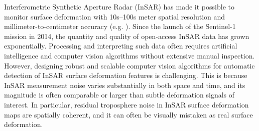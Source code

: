 Interferometric Synthetic Aperture Radar (InSAR) has made it possible to monitor surface deformation with 10s–100s meter spatial resolution and millimeter-to-centimeter accuracy (e.g. \cite{Pritchard2004InSARbasedsurvey,  Chaussard2014PredictabilityHydraulicHead,  Chen20142010SlowSlip, Biggs2017GlobalVolcanoMonitoring, Chen2016ConfinedAquiferHead, Fielding2017SurfaceDeformationNorth, Chen2019TriggeringMw7.2}). Since the launch of the Sentinel-1 mission in 2014, the quantity and quality of open-access InSAR data has grown exponentially. Processing and interpreting such data often requires artificial intelligence and computer vision algorithms without extensive manual inspection. However, designing robust and scalable computer vision algorithms for automatic detection of InSAR surface deformation features is challenging. This is because InSAR measurement noise varies substantially in both space and time, and its magnitude is often comparable or larger than subtle deformation signals of interest. In particular, residual troposphere noise in InSAR surface deformation maps are spatially coherent, and it can often be visually mistaken as real surface deformation.



